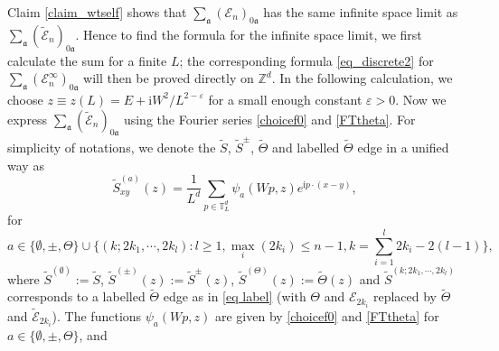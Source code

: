 \documentclass{article}
\newcommand{\1}{\mathds{1}}
\numberwithin{equation}{section}
\newcommand{\be}{\begin{equation}}
\newcommand{\ee}{\end{equation}}
\newcommand{\e}{{\varepsilon}}
\newcommand{\fa}{{\mathfrak a}}
\newcommand{\wt}{\widetilde}
\newcommand{\ii}{\mathrm{i}} %
\newcommand{\dd}{\mathrm{d}}
\renewcommand{\leq}{\leqslant}
\renewcommand{\geq}{\geqslant}
\renewcommand{\le}{\leq}
\renewcommand{\ge}{\geq}
\newcommand{\R}{\mathbb{R}}
\newcommand{\Z}{\mathbb{Z}}
\theoremstyle{plain} %
\theoremstyle{remark}
\newcommand{\cor}{\color{red}}
\newcommand{\Sele}{{\mathcal E}}
\newcommand{\Seleinf}{{\mathcal E}^{\infty}}
\begin{document}
Claim \ref{claim_wtself} shows that $\sum_{\fa}(\Sele_{n})_{0\fa }$ has the same infinite space limit as $\sum_{\fa}(\wt\Sele_{n})_{0\fa}$. Hence to find the formula for the infinite space limit, we first calculate the sum \smash{$\sum_\fa (\wt \Sele_{n})_{0\fa }$} for a finite $L$; the corresponding formula \eqref{eq_discrete2} for $\sum_\fa (\Seleinf_{n})_{0\fa }$ will then be proved directly on $\Z^d$. In the following calculation, we choose $z \equiv z(L)=E+ \ii W^{2}/L^{2-\e}$ for a small enough constant $\e>0$. 
Now we express $ \sum_{\fa} (\wt\Sele_{n})_{0\fa }$ using the Fourier series \eqref{choicef0} and \eqref{FTtheta}. %
For simplicity of notations, %
we denote the $\wt S$, $\wt S^\pm$, $\wt\Theta$ and labelled $\wt\Theta$ edge in a unified way as
$$\wt S^{(a)}_{xy}(z) =  \frac1{L^d}\sum_{p\in \mathbb T_L^d} \psi_{a}(Wp, z)e^{\ii p\cdot (x-y)},$$
for
$$ a\in \{\emptyset, \pm, \Theta\} \cup \Big\{ (k; 2k_1, \cdots, 2k_l): l\ge 1, \max_{i}(2k_i)\le n-1, k=\sum_{i=1}^l 2 k_i -2(l-1)  \Big\},$$
where $ \wt S^{(\emptyset)} :=\wt S $, $ \wt S^{(\pm)} (z):=\wt S^\pm(z) $, $\wt S^{(\Theta)} (z):=\wt\Theta(z)$ and $\wt S^{(k; 2k_1, \cdots, 2k_l)}$ corresponds to a labelled $\wt\Theta$ edge as in \eqref{eq label} (with $\Theta$ and $\Sele_{2k_i}$ replaced by $\wt\Theta$ and $\wt\Sele_{2k_i}$). The functions $\psi_a(Wp,z)$ are given by \eqref{choicef0} and \eqref{FTtheta} for $a\in \{\emptyset, \pm, \Theta\}$, and %
\end{document}
